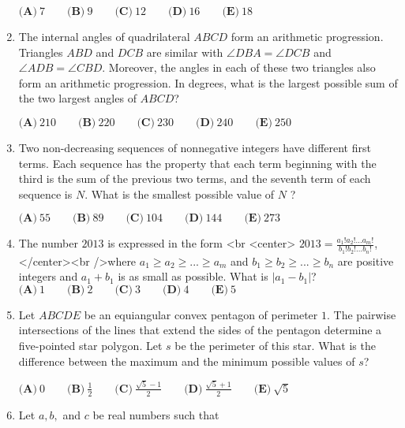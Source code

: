 \documentclass{article}
\begin{document}
\begin{enumerate}[label=\arabic*., itemsep=0.5em]
$\textbf{(A)}\ 7 \qquad \textbf{(B)}\ 9 \qquad \textbf{(C)}\ 12 \qquad \textbf{(D)}\ 16 \qquad \textbf{(E)}\ 18$\par \vspace{0.5em}\item The internal angles of quadrilateral $ABCD$ form an arithmetic progression. Triangles $ABD$ and $DCB$ are similar with $\angle DBA = \angle DCB$ and $\angle ADB = \angle CBD$. Moreover, the angles in each of these two triangles also form an arithmetic progression. In degrees, what is the largest possible sum of the two largest angles of $ABCD$?

$\textbf{(A)}\ 210 \qquad \textbf{(B)}\ 220 \qquad \textbf{(C)}\ 230 \qquad \textbf{(D)}\ 240 \qquad \textbf{(E)}\ 250$\par \vspace{0.5em}\item Two non-decreasing sequences of nonnegative integers have different first terms. Each sequence has the property that each term beginning with the third is the sum of the previous two terms, and the seventh term of each sequence is $N$. What is the smallest possible value of $N$ ?

$\textbf{(A)}\ 55 \qquad \textbf{(B)}\ 89 \qquad \textbf{(C)}\ 104 \qquad \textbf{(D)}\ 144 \qquad \textbf{(E)}\ 273$\par \vspace{0.5em}\item The number $2013$ is expressed in the form <br \> <center> $2013 = \frac {a_1!a_2!...a_m!}{b_1!b_2!...b_n!}$,</center><br />where $a_1 \ge a_2 \ge ... \ge a_m$ and $b_1 \ge b_2 \ge ... \ge b_n$ are positive integers and $a_1 + b_1$ is as small as possible. What is $|a_1 - b_1|$?
$\textbf{(A)}\ 1 \qquad \textbf{(B)}\ 2 \qquad \textbf{(C)}\ 3 \qquad \textbf{(D)}\ 4 \qquad \textbf{(E)}\ 5$\par \vspace{0.5em}\item Let $ABCDE$ be an equiangular convex pentagon of perimeter $1$. The pairwise intersections of the lines that extend the sides of the pentagon determine a five-pointed star polygon. Let $s$ be the perimeter of this star. What is the difference between the maximum and the minimum possible values of $s$?

$\textbf{(A)}\ 0 \qquad \textbf{(B)}\ \frac{1}{2} \qquad \textbf{(C)}\ \frac{\sqrt{5}-1}{2} \qquad \textbf{(D)}\  \frac{\sqrt{5}+1}{2} \qquad \textbf{(E)}\ \sqrt{5}$\par \vspace{0.5em}\item Let $a,b,$ and $c$ be real numbers such that 



\end{enumerate}
\end{document}
